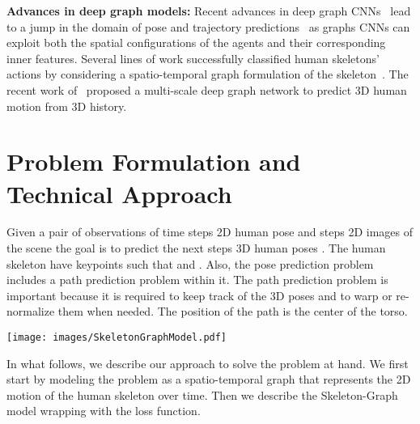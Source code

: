 \documentclass[10pt,twocolumn,letterpaper]{article}
\newcommand*{\ours}{Skeleton-Graph }
\begin{document}
\textbf{Advances in deep graph models: }Recent advances in deep graph CNNs~\cite{kipf2016semi} lead to a jump in the domain of pose and trajectory predictions~\cite{mohamed2020social,huang2019stgat,wang2021graphtcn,cai2019exploiting,wang2021graphtcn} as graphs CNNs can exploit both the spatial configurations of the agents and their corresponding inner features. Several lines of work successfully classified human skeletons' actions by considering a spatio-temporal graph formulation of the skeleton~\cite{yan2018spatial,huang2020spatio}. The recent work of~\cite{li2020dynamic} proposed a multi-scale deep graph network to predict 3D human motion from 3D history.

\section{Problem Formulation and Technical Approach}
Given a pair of observations of  time steps 2D human pose  and  steps 2D images  of the scene the goal is to predict the next  steps 3D human poses . The human skeleton have  keypoints such that  and . Also, the pose prediction problem includes a path prediction problem within it. The path prediction problem is important because it is required to keep track of the 3D poses and to warp or re-normalize them when needed. The position of the path is the center of the torso.

\begin{figure*}[t]
\begin{center}
\texttt{[image: images/SkeletonGraphModel.pdf]}
\end{center}
   \caption{\ours model components. The model receives as an input a 2D skeleton temporal  graph poses  and predicts the the next 3D skeleton temporal poses. The model can learn a suitable adjacency  matrix through the adjacency CNN. Also, it can use the observed visual signal in the form of a still image or a video. The time-extrapolator CNN is responsible for predicting the next  temporal 3D poses, while the spatio-temporal graph CNN processes the 2D temporal graphs.  are the number of the skeleton joints, the learned features dimensions, the vision features channels and the joint coordinates, respectively. }
\label{gr:model}
\end{figure*}
In what follows, we describe our approach to solve the problem at hand. We first start by modeling the problem as a spatio-temporal graph that represents the 2D motion of the human skeleton over time. Then we describe the \ours model wrapping with the loss function. 
\end{document}
